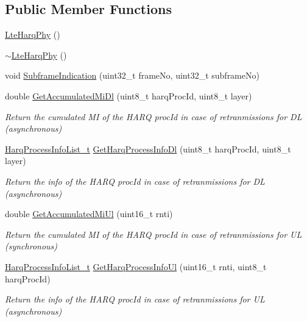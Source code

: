 \subsection*{Public Member Functions}
\begin{DoxyCompactItemize}
\item 
\hyperlink{classns3_1_1LteHarqPhy_a71fbfa502b92d484d0793f93dde55791}{Lte\+Harq\+Phy} ()
\item 
\hyperlink{classns3_1_1LteHarqPhy_afad8ed03b8aeaac6484969099534f868}{$\sim$\+Lte\+Harq\+Phy} ()
\item 
void \hyperlink{classns3_1_1LteHarqPhy_a4bfa3de35cf9417bde93be25296a4b30}{Subframe\+Indication} (uint32\+\_\+t frame\+No, uint32\+\_\+t subframe\+No)
\item 
double \hyperlink{classns3_1_1LteHarqPhy_ae3a09046b0956ab7f1f94ab3f4ec0ccb}{Get\+Accumulated\+Mi\+Dl} (uint8\+\_\+t harq\+Proc\+Id, uint8\+\_\+t layer)
\begin{DoxyCompactList}\small\item\em Return the cumulated MI of the H\+A\+RQ proc\+Id in case of retranmissions for DL (asynchronous) \end{DoxyCompactList}\item 
\hyperlink{namespacens3_a8e9da9f7a4e5c0954a109b0e1dc36e40}{Harq\+Process\+Info\+List\+\_\+t} \hyperlink{classns3_1_1LteHarqPhy_a726a1d8ff621412e0960972b28351857}{Get\+Harq\+Process\+Info\+Dl} (uint8\+\_\+t harq\+Proc\+Id, uint8\+\_\+t layer)
\begin{DoxyCompactList}\small\item\em Return the info of the H\+A\+RQ proc\+Id in case of retranmissions for DL (asynchronous) \end{DoxyCompactList}\item 
double \hyperlink{classns3_1_1LteHarqPhy_a5c5c896b9bdd799d418d565c0b452829}{Get\+Accumulated\+Mi\+Ul} (uint16\+\_\+t rnti)
\begin{DoxyCompactList}\small\item\em Return the cumulated MI of the H\+A\+RQ proc\+Id in case of retranmissions for UL (synchronous) \end{DoxyCompactList}\item 
\hyperlink{namespacens3_a8e9da9f7a4e5c0954a109b0e1dc36e40}{Harq\+Process\+Info\+List\+\_\+t} \hyperlink{classns3_1_1LteHarqPhy_a798aed92dad159478955ba606de64537}{Get\+Harq\+Process\+Info\+Ul} (uint16\+\_\+t rnti, uint8\+\_\+t harq\+Proc\+Id)
\begin{DoxyCompactList}\small\item\em Return the info of the H\+A\+RQ proc\+Id in case of retranmissions for UL (asynchronous) \end{DoxyCompactList}\item 

\end{DoxyCompactItemize}
